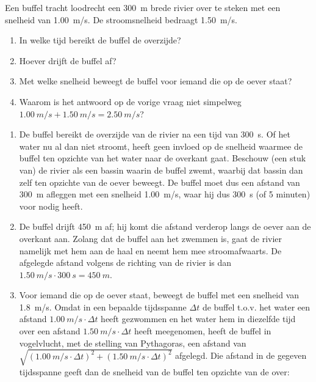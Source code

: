 \documentclass{ximera}
\begin{document}
\begin{denkvraag*}{}
	Een buffel tracht loodrecht een \SI{300}{m} brede rivier over te steken met een snelheid van \SI{1,00}{m/s}. De stroomsnelheid bedraagt \SI{1,50}{m/s}.
\begin{enumerate}
		\item In welke tijd bereikt de buffel de overzijde?
		\item Hoever drijft de buffel af?
		\item Met welke snelheid beweegt de buffel voor iemand die op de oever staat?
        \item Waarom is het antwoord op de vorige vraag niet simpelweg $\SI{1,00}{m/s}+\SI{1,50}{m/s}=\SI{2,50}{m/s}$?
\end{enumerate}
\begin{oplossing}
    \begin{enumerate}
        \item De buffel bereikt de overzijde van de rivier na een tijd van \SI{300}{s}. Of het water nu al dan niet stroomt, heeft geen invloed op de snelheid waarmee de buffel ten opzichte van het water naar de overkant gaat. Beschouw (een stuk van) de rivier als een bassin waarin de buffel zwemt, waarbij dat bassin dan zelf ten opzichte van de oever beweegt. De buffel moet dus een afstand van \SI{300}{m} afleggen met een snelheid \SI{1,00}{m/s}, waar hij dus \SI{300}{s} (of 5 minuten) voor nodig heeft.
        \item De buffel drijft \SI{450}{m} af; hij komt die afstand verderop langs de oever aan de overkant aan. Zolang dat de buffel aan het zwemmen is, gaat de rivier namelijk met hem aan de haal en neemt hem mee stroomafwaarts. De afgelegde afstand volgens de richting van de rivier is dan $\SI{1,50}{m/s}\cdot\SI{300}{s}=\SI{450}{m}$.
        \item Voor iemand die op de oever staat, beweegt de buffel met een snelheid van \SI{1,8}{m/s}. Omdat in een bepaalde tijdsspanne $\Delta t$ de buffel t.o.v. het water een afstand $\SI{1,00}{m/s}\cdot\Delta t$ heeft gezwommen en het water hem in diezelfde tijd over een afstand $\SI{1,50}{m/s}\cdot\Delta t$ heeft meegenomen, heeft de buffel in vogelvlucht, met de stelling van Pythagoras, een afstand van $\sqrt{(\SI{1,00}{m/s}\cdot\Delta t)^2+(\SI{1,50}{m/s}\cdot\Delta t)^2}$ afgelegd. Die afstand in de gegeven tijdsspanne geeft dan de snelheid van de buffel ten opzichte van de over:

\end{enumerate}
\end{oplossing}
\end{denkvraag*}
\end{document}
